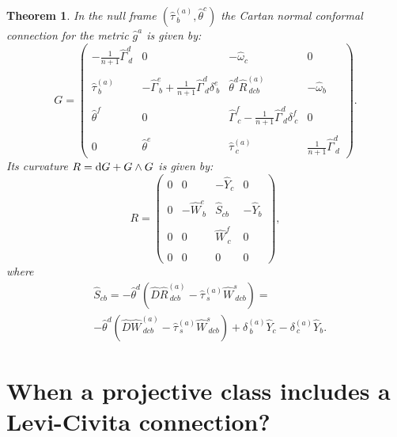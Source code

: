 \documentclass[letterpaper]{amsart}
\newtheorem{theorem}{Theorem}[section]
\theoremstyle{definition}
\theoremstyle{remark}
\newcommand{\dz}{\wedge}
\newcommand{\der}{{\rm d}}
\newcommand{\bma}{\begin{pmatrix}}
\newcommand{\ema}{\end{pmatrix}}
\begin{document}
\begin{theorem}
In the null frame $(\hat{\tau}^{(a)}_{~b},\hat{\theta}^c)$ the Cartan
normal conformal connection for the metric $\hat{g}^a$ is given by:
$$
G=\bma
-\tfrac{1}{n+1}\hat{\Gamma}^d_{~d}&0&-\hat{\omega}_c&0\\
&&&\\
\hat{\tau}^{(a)}_{~b}&-\hat{\Gamma}^e_{~b}+\tfrac{1}{n+1}\hat{\Gamma}^d_{~d}\delta^e_{~b}&\hat{\theta}^d\hat{R}^{(a)}_{~dcb}&-\hat{\omega}_b\\
&&&\\
\hat{\theta}^f&0&\hat{\Gamma}^f_{~c}-
\tfrac{1}{n+1}\hat{\Gamma}^d_{~d}\delta^f_{~c}&0\\
&&&\\
0&\hat{\theta}^e&\hat{\tau}^{(a)}_{~c}&\tfrac{1}{n+1}\hat{\Gamma}^d_{~d}
\ema.
$$
Its curvature $R=\der G+G\dz G$ is given by:
$$R=\bma
0&0&-\hat{Y}_c&0\\
&&&\\
0&-\hat{W}^e_{~b}&\hat{S}_{cb}&-\hat{Y}_b\\
&&&\\
0&0&\hat{W}^f_{~c}&0\\
&&&\\
0&0&0&0
\ema,$$
where 
$$
\begin{aligned}
&\hat{S}_{cb}=-\hat{\theta}^d(\hat{D}\hat{R}^{(a)}_{~dcb}-\hat{\tau}^{(a)}_{~s}\hat{W}^s_{~dcb})=\\
&-\hat{\theta}^d(\hat{D}\hat{W}^{(a)}_{~dcb}-\hat{\tau}^{(a)}_{~s}\hat{W}^s_{~dcb})+\delta^{(a)}_{~b}\hat{Y}_c-\delta^{(a)}_{~c}\hat{Y}_b.\end{aligned}$$
\end{theorem} 
\section{When a projective class includes a Levi-Civita connection?}\label{sec2}
\end{document}

